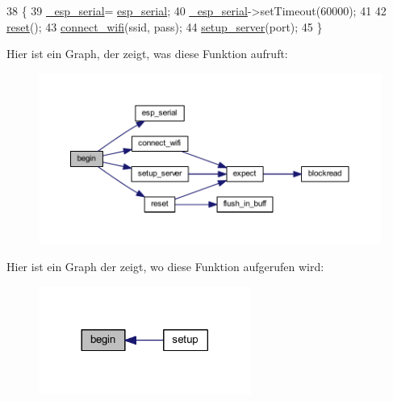 \begin{DoxyCode}
38 \{
39   \hyperlink{class_esp_server_a552aab874ad99b696f4c997d6f5a4746}{\_esp\_serial}= \hyperlink{_arduino__kommentiert_8ino_af690b3a6882292855c4091ede8039998}{esp\_serial};
40   \hyperlink{class_esp_server_a552aab874ad99b696f4c997d6f5a4746}{\_esp\_serial}->setTimeout(60000);
41 
42   \hyperlink{class_esp_server_ad20897c5c8bd47f5d4005989bead0e55}{reset}();
43   \hyperlink{class_esp_server_a504393c8aa6394b2d0631146425bf011}{connect\_wifi}(ssid, pass);
44   \hyperlink{class_esp_server_a7968cc44a6c9fff24b9020e1714c49f8}{setup\_server}(port);
45 \}
\end{DoxyCode}
Hier ist ein Graph, der zeigt, was diese Funktion aufruft\+:\nopagebreak
\begin{figure}[H]
\begin{center}
\leavevmode
\includegraphics[width=350pt]{class_esp_server_a1d8682ca0934af03639311e23a71283f_cgraph}
\end{center}
\end{figure}
Hier ist ein Graph der zeigt, wo diese Funktion aufgerufen wird\+:\nopagebreak
\begin{figure}[H]
\begin{center}
\leavevmode
\includegraphics[width=197pt]{class_esp_server_a1d8682ca0934af03639311e23a71283f_icgraph}
\end{center}
\end{figure}
\mbox{\label{class_esp_server_ac2b4ae3c7ebcd751c4c8020412fa3270}} 
